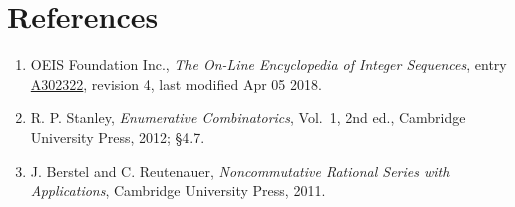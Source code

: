 \documentclass[11pt]{article}
\theoremstyle{definition}
\begin{document}
\section{References}

\begin{enumerate}

\item OEIS Foundation Inc., \emph{The On-Line Encyclopedia of Integer Sequences}, entry \href{https://oeis.org/A302322}{A302322}, revision 4, last modified Apr 05 2018.

\item R. P. Stanley, \emph{Enumerative Combinatorics}, Vol.~1, 2nd ed., Cambridge University Press, 2012; \S4.7.

\item J. Berstel and C. Reutenauer, \emph{Noncommutative Rational Series with Applications}, Cambridge University Press, 2011.

\end{enumerate}
\end{document}
